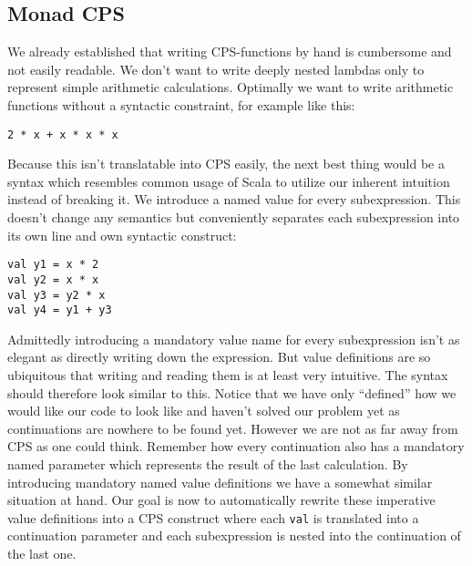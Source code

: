 \subsection{Monad CPS} \label{sec:monadCPS}

We already established that writing CPS-functions by hand is cumbersome and not easily readable. We don't want to write deeply nested lambdas only to represent simple arithmetic calculations. Optimally we want to write arithmetic functions without a syntactic constraint, for example like this:
\begin{lstlisting}
2 * x + x * x * x
\end{lstlisting}
Because this isn't translatable into CPS easily, the next best thing would be a syntax which resembles common usage of Scala to utilize our inherent intuition instead of breaking it. We introduce a named value for every subexpression. This doesn't change any semantics but conveniently separates each subexpression into its own line and own syntactic construct:
\begin{lstlisting}
val y1 = x * 2
val y2 = x * x
val y3 = y2 * x
val y4 = y1 + y3
\end{lstlisting}
Admittedly introducing a mandatory value name for every subexpression isn't as elegant as directly writing down the expression. But value definitions are so ubiquitous that writing and reading them is at least very intuitive. The syntax should therefore look similar to this. Notice that we have only ``defined'' how we would like our code to look like and haven't solved our problem yet as continuations are nowhere to be found yet. However we are not as far away from CPS as one could think. Remember how every continuation also has a mandatory named parameter which represents the result of the last calculation. By introducing mandatory named value definitions we have a somewhat similar situation at hand. Our goal is now to automatically rewrite these imperative value definitions into a CPS construct where each \lstinline{val} is translated into a continuation parameter and each subexpression is nested into the continuation of the last one. 

